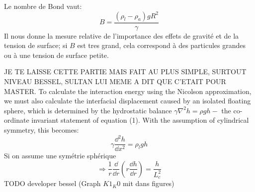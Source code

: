     Le nombre de Bond vaut:
    \begin{equation}
        B = \frac{(\rho_l-\rho_{a})gR^2}{\gamma}
    \end{equation}
    Il nous donne la mesure relative de l'importance des effets de gravité et de la tension de surface; si $B$ est tres grand, cela correspond à des particules grandes ou à une tension de surface petite. 




    JE TE LAISSE CETTE PARTIE MAIS FAIT AU PLUS SIMPLE, SURTOUT NIVEAU BESSEL, SULTAN LUI MEME A DIT QUE C'ETAIT POUR MASTER.
    To calculate the interaction energy using the Nicolson approximation, we must also calculate the interfacial displacement caused by an isolated floating sphere, which is determined by the hydrostatic balance \(\gamma\nabla^2h = \rho gh -\) the co-ordinate invariant statement of equation (1). With the assumption of cylindrical symmetry, this becomes:
    \begin{equation}
        \gamma \frac{\dd^2h}{\dd x^2} = \rho_l g h
    \end{equation}
    Si on assume une symétrie sphérique
    \begin{equation}
        \Rightarrow \frac{1}{r} \frac{\dd}{\dd r} \left( r\frac{\dd h}{\dd r}\right) = \frac{h}{L_c^2}
    \end{equation}
    TODO developer bessel (Graph $K1_K0$ mit dans figures)
    \cite{introtoBessel}

